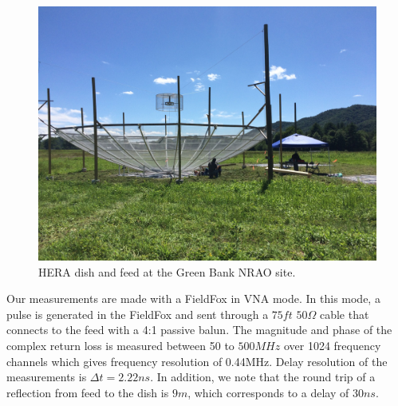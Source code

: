 \documentclass[12pt,preprint]{aastex}
\begin{document}
\begin{figure}[ht!]
\centering
\includegraphics[trim={2cm 20cm 30cm 15cm},clip, totalheight=0.3\textheight]{plots/heradish.jpg}
\caption{HERA dish and feed at the Green Bank NRAO site.}
\label{fig:heradish}
\end{figure}

Our measurements are made with a FieldFox in VNA mode. In this mode, a pulse
is generated in the FieldFox and sent through a $75ft$ $50\Omega$ cable that
connects to the feed with a 4:1 passive balun. The magnitude and phase of the complex return loss is measured between 50 to $500MHz$ over 1024 frequency channels which gives frequency resolution of 0.44MHz. Delay resolution of the measurements is $\Delta{t}=2.22ns$.
In addition, we note that the round trip of a reflection from feed to the dish
is $9m$, which corresponds to a delay of $30ns$.



\end{document}
